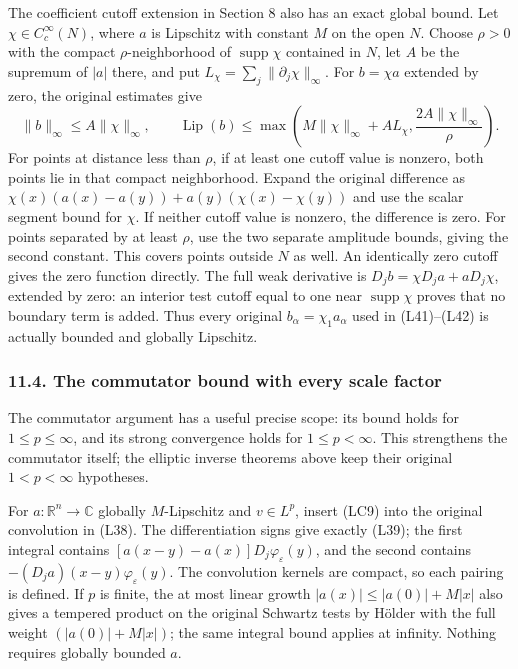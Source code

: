 \documentclass[
  11pt,
]{article}
\makeatletter
\let\ReaderOriginalAnchorStart\hyper@anchorstart
\let\ReaderOriginalAnchorEnd\hyper@anchorend
\let\ReaderPendingAliases\@empty
\def\ReaderArmAliases#1{\gdef\ReaderPendingAliases{#1}}
\def\hyper@anchorstart#1{\ReaderIfNativeAnchorTF{#1}{\ReaderPendingAliases\global\let\ReaderPendingAliases\@empty}{}\ReaderOriginalAnchorStart{#1}}
\makeatother
\begin{document}
The coefficient cutoff extension in Section 8 also has an exact global
bound. Let \(\chi\in C_c^\infty(N)\), where \(a\) is Lipschitz with
constant \(M\) on the open \(N\). Choose \(\rho>0\) with the compact
\(\rho\)-neighborhood of \(\operatorname{supp}\chi\) contained in \(N\),
let \(A\) be the supremum of \(|a|\) there, and put
\(L_\chi=\sum_j\|\partial_j\chi\|_\infty\). For \(b=\chi a\) extended by
zero, the original estimates give \[
 \|b\|_\infty\leq A\|\chi\|_\infty,\qquad
 \operatorname{Lip}(b)
 \leq\max\left(M\|\chi\|_\infty+A L_\chi,
                     \frac{2A\|\chi\|_\infty}{\rho}\right).
                                                               \tag{LC10}
\] For points at distance less than \(\rho\), if at least one cutoff
value is nonzero, both points lie in that compact neighborhood. Expand
the original difference as \(\chi(x)(a(x)-a(y))+a(y)(\chi(x)-\chi(y))\)
and use the scalar segment bound for \(\chi\). If neither cutoff value
is nonzero, the difference is zero. For points separated by at least
\(\rho\), use the two separate amplitude bounds, giving the second
constant. This covers points outside \(N\) as well. An identically zero
cutoff gives the zero function directly. The full weak derivative is
\(D_jb=\chi D_ja+aD_j\chi\), extended by zero: an interior test cutoff
equal to one near \(\operatorname{supp}\chi\) proves that no boundary
term is added. Thus every original \(b_\alpha=\chi_1a_\alpha\) used in
(L41)--(L42) is actually bounded and globally Lipschitz.

\ReaderArmAliases{\ReaderOriginalAnchorStart{AN03-LCE-LIP-004}\ReaderOriginalAnchorEnd\begingroup\expandafter\def\csname @currentHref\endcsname{AN03-LCE-LIP-004}\label{AN03-LCE-LIP-004}\endgroup\ReaderOriginalAnchorStart{the-commutator-bound-with-every-scale-factor}\ReaderOriginalAnchorEnd}
\subsubsection{11.4. The commutator bound with every scale
factor}\label{the-commutator-bound-with-every-scale-factor}

The commutator argument has a useful precise scope: its bound holds for
\(1\leq p\leq\infty\), and its strong convergence holds for
\(1\leq p<\infty\). This strengthens the commutator itself; the elliptic
inverse theorems above keep their original \(1<p<\infty\) hypotheses.

For \(a:\mathbb R^n\to\mathbb C\) globally \(M\)-Lipschitz and
\(v\in L^p\), insert (LC9) into the original convolution in (L38). The
differentiation signs give exactly (L39); the first integral contains
\([a(x-y)-a(x)]D_j\varphi_\varepsilon(y)\), and the second contains
\(-(D_ja)(x-y)\varphi_\varepsilon(y)\). The convolution kernels are
compact, so each pairing is defined. If \(p\) is finite, the at most
linear growth \(|a(x)|\leq|a(0)|+M|x|\) also gives a tempered product on
the original Schwartz tests by Hölder with the full weight
\((|a(0)|+M|x|)\); the same integral bound applies at infinity. Nothing
requires globally bounded \(a\).
\end{document}

